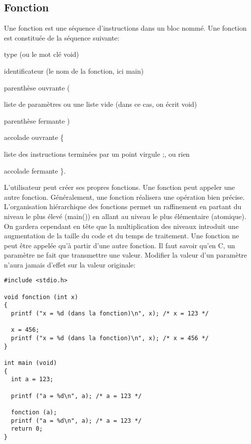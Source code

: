 \documentclass[a4paper]{article}
\begin{document}
\subsection{Fonction}
Une fonction est une séquence d'instructions dans un bloc nommé. Une fonction est constituée de la séquence suivante:
\begin{description}
  \item type (ou le mot clé void)
  \item identificateur (le nom de la fonction, ici main)
  \item parenthèse ouvrante \guillemotleft{} (\guillemotright{}
  \item liste de paramètres ou une liste vide (dans ce cas, on écrit void)
  \item parenthèse fermante \guillemotleft{}) \guillemotright{}
  \item accolade ouvrante \guillemotleft{}\{\guillemotright{}
  \item liste des instructions terminées par un point virgule \guillemotleft{};\guillemotright{}, ou rien
  \item accolade fermante \guillemotleft{}\}\guillemotright{}.
\end{description}
  L'utilisateur peut créer ses propres fonctions. Une fonction peut appeler une autre fonction. Généralement, une fonction réalisera une opération bien précise. L'organisation hiérarchique des fonctions permet un raffinement en partant du niveau le plus élevé (main()) en allant au niveau le plus élémentaire (atomique).\newline
On gardera cependant en tête que la multiplication des niveaux introduit une augmentation de la taille du code et du temps de traitement.\newline
Une fonction ne peut être appelée qu'à partir d'une autre fonction.\newline
Il faut savoir qu'en C, un paramètre ne fait que transmettre une valeur. Modifier la valeur d'un paramètre n'aura jamais d'effet sur la valeur originale:
\begin{lstlisting}
#include <stdio.h>

void fonction (int x)
{
  printf ("x = %d (dans la fonction)\n", x); /* x = 123 */

  x = 456;
  printf ("x = %d (dans la fonction)\n", x); /* x = 456 */
}

int main (void)
{
  int a = 123;

  printf ("a = %d\n", a); /* a = 123 */

  fonction (a);
  printf ("a = %d\n", a); /* a = 123 */
  return 0;
}
\end{lstlisting}
\end{document}
